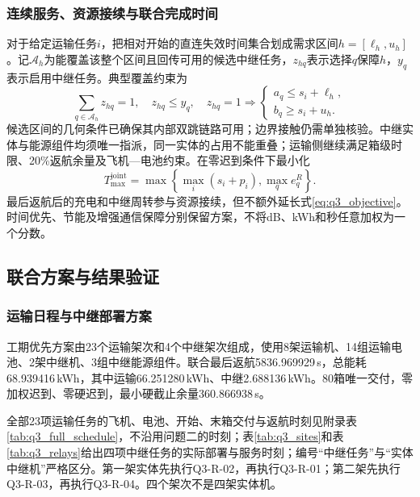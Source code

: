 \subsubsection{连续服务、资源接续与联合完成时间}
对于给定运输任务$i$，把相对开始的直连失效时间集合划成需求区间$h=[\ell_h,u_h]$。记$\mathcal A_h$为能覆盖该整个区间且回传可用的候选中继任务，$z_{hq}$表示选择$q$保障$h$，$y_q$表示启用中继任务。典型覆盖约束为
\begin{equation}
 \sum_{q\in\mathcal A_h}z_{hq}=1,\quad z_{hq}\le y_q,\quad
 z_{hq}=1\Rightarrow
 \begin{cases}a_q\le s_i+\ell_h,\\ b_q\ge s_i+u_h.\end{cases}
\label{eq:q3_cover}
\end{equation}
候选区间的几何条件已确保其内部双跳链路可用；边界接触仍需单独核验。中继实体与能源组件均须唯一指派，同一实体的占用不能重叠；运输侧继续满足箱级时限、20\%返航余量及飞机—电池约束。在零迟到条件下最小化
\begin{equation}
 T_{\max}^{\mathrm{joint}}=\max\left\{\max_i(s_i+p_i),\max_q e_q^R\right\}.
\label{eq:q3_objective}
\end{equation}
最后返航后的充电和中继周转参与资源接续，但不额外延长式\eqref{eq:q3_objective}。时间优先、节能及增强通信保障分别保留方案，不将dB、kWh和秒任意加权为一个分数。







\subsection{联合方案与结果验证}
\subsubsection{运输日程与中继部署方案}
工期优先方案由23个运输架次和4个中继架次组成，使用8架运输机、14组运输电池、2架中继机、3组中继能源组件。联合最后返航5836.969929\,s，总能耗68.939416\,kWh，其中运输66.251280\,kWh、中继2.688136\,kWh。80箱唯一交付，零加权迟到、零硬迟到，最小硬截止余量360.866938\,s。

全部23项运输任务的飞机、电池、开始、末箱交付与返航时刻见附录表\ref{tab:q3_full_schedule}，不沿用问题二的时刻；表\ref{tab:q3_sites}和表\ref{tab:q3_relays}给出四项中继任务的实际部署与服务时刻；编号“中继任务”与“实体中继机”严格区分。第一架实体先执行Q3-R-02，再执行Q3-R-01；第二架先执行Q3-R-03，再执行Q3-R-04。四个架次不是四架实体机。



